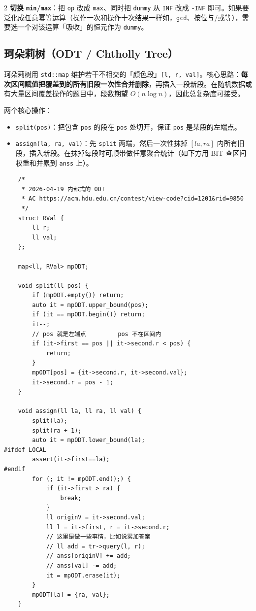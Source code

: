 \begin{multicols*}{2}
		\textbf{切换 \texttt{min}/\texttt{max}}：把 \verb|op| 改成 \verb|max|、同时把 \verb|dummy| 从 \verb|INF| 改成 \verb|-INF| 即可。如果要泛化成任意幂等运算（操作一次和操作十次结果一样如，\verb|gcd|、按位与/或等），需要选一个对该运算「吸收」的恒元作为 \verb|dummy|。

		\subsection{珂朵莉树（ODT / Chtholly Tree）}

		珂朵莉树用 \verb|std::map| 维护若干不相交的「颜色段」\verb|[l, r, val]|。核心思路：\textbf{每次区间赋值把覆盖到的所有旧段一次性合并删除}，再插入一段新段。在随机数据或有大量区间覆盖操作的题目中，段数期望 $O(n \log n)$，因此总复杂度可接受。

		两个核心操作：
		\begin{itemize}
			\item \verb|split(pos)|：把包含 \verb|pos| 的段在 \verb|pos| 处切开，保证 \verb|pos| 是某段的左端点。
			\item \verb|assign(la, ra, val)|：先 \verb|split| 两端，然后一次性抹掉 $[la, ra]$ 内所有旧段，插入新段。在抹掉每段时可顺带做任意聚合统计（如下方用 BIT 查区间权重和并累到 \verb|anss| 上）。
		\end{itemize}

		\begin{verbatim}
	/*
	 * 2026-04-19 内部式的 ODT
	 * AC https://acm.hdu.edu.cn/contest/view-code?cid=1201&rid=9850
	 */
	struct RVal {
		ll r;
		ll val;
	};

	map<ll, RVal> mpODT;

	void split(ll pos) {
		if (mpODT.empty()) return;
		auto it = mpODT.upper_bound(pos);
		if (it == mpODT.begin()) return;
		it--;
		// pos 就是左端点         pos 不在区间内
		if (it->first == pos || it->second.r < pos) {
			return;
		}
		mpODT[pos] = {it->second.r, it->second.val};
		it->second.r = pos - 1;
	}

	void assign(ll la, ll ra, ll val) {
		split(la);
		split(ra + 1);
		auto it = mpODT.lower_bound(la);
#ifdef LOCAL
		assert(it->first==la);
#endif
		for (; it != mpODT.end();) {
			if (it->first > ra) {
				break;
			}
			ll originV = it->second.val;
			ll l = it->first, r = it->second.r;
			// 这里是做一些事情，比如说累加答案
			// ll add = tr->query(l, r);
			// anss[originV] += add;
			// anss[val] -= add;
			it = mpODT.erase(it);
		}
		mpODT[la] = {ra, val};
	}
		\end{verbatim}


\end{multicols*}
